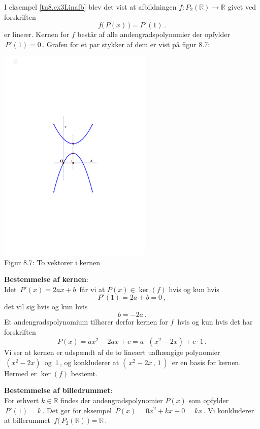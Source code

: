 \begin{example}\label{tn8.kerneForFunktion}
I eksempel \ref{tn8.ex3Linafb} blev det vist at afbildningen $f:P_2(\mathbb R) \rightarrow \mathbb R$ givet ved forskriften
\begin{equation}
f\big(\,P(x)\,\big)=P'(1)\,.
\end{equation}
er lineær. Kernen for $f$ består af alle andengradspolynomier der opfylder $\,P'(1)=0\,$. Grafen for et par stykker af dem er vist på figur 8.7:

\begin{center}
		\includegraphics[trim=3cm 10cm 3cm
 10.3cm,width=0.55\textwidth,clip]{kernen.pdf}
  \\Figur 8.7: To vektorer i kernen 
\end{center}

\textbf{Bestemmelse af kernen}:\\
Idet $\,P'(x)=2ax+b\,$ får vi at $P(x)\in \ker(f)$ hvis og kun hvis
$$P'(1)=2a+b=0\,,$$
det vil sig hvis og kun hvis
$$b=-2a\,.$$
Et andengradspolynomium tilhører derfor kernen for $f\,$ hvis og kun hvis det har forskriften
$$P(x)=ax^2-2ax+c=a\cdot(x^2-2x)+c\cdot 1\,.$$
Vi ser at kernen er udspændt af de to lineært uafhængige polynomier $\,(x^2-2x)\,$ og $\,1\,$, og konkluderer at  $(\,x^2-2x\,,\,1\,)\,$ er en basis for kernen. Hermed er $\ker(f)$ bestemt.\bs

\textbf{Bestemmelse af billedrummet}:\\
For ethvert $k\in\mathbb R$ findes der andengradspolynomier $P(x)$ som opfylder $\,P'(1)=k\,$. Det gør for eksempel $\,P(x)=0x^2+kx+0=kx\,$. Vi konkluderer at billerummet $\,f\big(\,P_2(\mathbb R)\,\big)=\mathbb R\,.$
\end{example}

